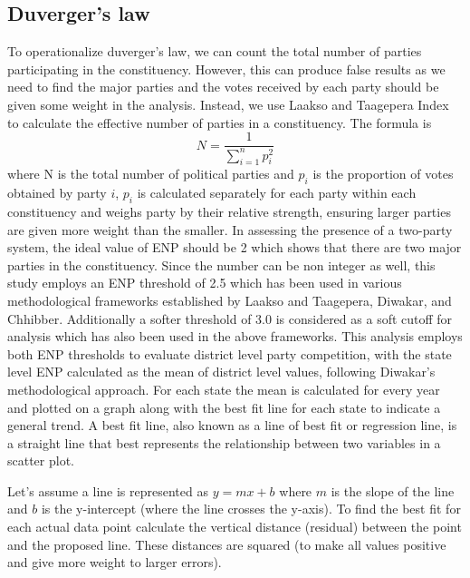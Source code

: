 \subsection{Duverger's law}
To operationalize duverger's law, we can count the total number of parties participating in the constituency. However, this can produce false results as we need to find the major parties and the votes received by each party should be given some weight in the analysis. Instead, we use Laakso and Taagepera Index \citep{laakso1979effective} to calculate the effective number of parties in a constituency. The formula is
\begin{equation*}
N = \frac{1}{\sum_{i=1}^{n} p_i^2}
\end{equation*}
where N is the total number of political parties and $p_i$ is the proportion of votes obtained by party $i$, $p_i$ is calculated separately for each party within each constituency and weighs party by their relative strength, ensuring larger parties are given more weight than the smaller. In assessing the presence of a two-party system, the ideal value of ENP should be 2 which shows that there are two major parties in the constituency. Since the number can be non integer as well, this study employs an ENP threshold of 2.5 which has been used in various methodological frameworks established by Laakso and Taagepera, Diwakar, and Chhibber. Additionally a softer threshold of 3.0 is considered as a soft cutoff for analysis which has also been used in the above frameworks. This analysis employs both ENP thresholds to evaluate district level party competition, with the state level ENP calculated as the mean of district level values, following Diwakar's methodological approach. For each state the mean is calculated for every year and plotted on a graph along with the best fit line for each state to indicate a general trend. A best fit line, also known as a line of best fit or regression line, is a straight line that best represents the relationship between two variables in a scatter plot. 

\vspace{0.3cm}

Let's assume a line is represented as $y = mx + b$ where $m$ is the slope of the line and $b$ is the y-intercept (where the line crosses the y-axis). To find the best fit for each actual data point calculate the vertical distance (residual) between the point and the proposed line. These distances are squared (to make all values positive and give more weight to larger errors).

